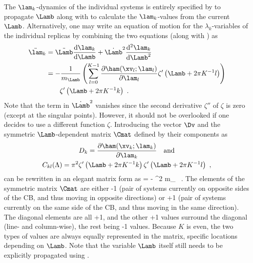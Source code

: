 The $\lam_k$-dynamics of the individual systems is entirely
specified by  to propagate $\Lamb$
along with   to calculate the $\lam_k$-values from the current $\Lamb$.
Alternatively, one may write an equation of motion for the $\lambda_k$-variables of the 
individual replicas by combining the two equations (along with ) as
%
\begin{align}
  \label{eq:cb_lam_eq_mot}
  \ddot{\lam}_k &= \ddot{\Lamb} \frac{\mathrm{d} \lam_k}{\mathrm{d} \Lamb} + \dot{\Lamb}^2 \frac{\mathrm{d^2} \lam_k}{\mathrm{d} \Lamb^2} \nonumber\\
                &= -\frac {1} {m_{\Lamb}} \left( 
                       \sum_{l=0}^{K-1} \frac {\partial\ham(\xv_{l};\lam_{l})} {\partial \lam_{l}} \zeta'\left( \Lamb + 2\pi K^{-1} l \right) 
                       \right) \nonumber  \\
                   & \qquad \zeta'\left( \Lamb + 2\pi K^{-1} k \right) \ .
\end{align}
%
%
Note that the term in $\dot{\Lamb}^2$ vanishes since the second derivative $\zeta''$ of $\zeta$
is zero (except at the  singular points). However, it should not be overlooked 
if one decides to use a different function $\zeta$.
%
Introducing the vector $\Dv$ and the symmetric $\Lamb$-dependent matrix $\Cmat$ defined 
by their components as
%
\begin{multline}
  \label{eq:cb_def}
 D_k = \frac{\partial\ham(\xv_{k};\lam_{k})}{\partial \lam_{k}}
\ \ \ \mathrm{and}\\
C_{kl}(\Lambda) = \pi^2 \zeta'\left( \Lamb + 2\pi K^{-1} k \right) \zeta'\left( \Lamb + 2\pi K^{-1} l \right) \ ,
\end{multline}
%
 can be rewritten in an elegant matrix form as
%
  \ddot{\lamv} = -\frac {\Cmat(\Lamb)} {\pi^2 m_{\Lamb}}  \Dv \ .
\eeq
%
The elements of the symmetric matrix $\Cmat$
are either -1 (pair of systems currently on opposite sides of the CB,
and thus moving in opposite directions) or +1
(pair of systems currently on the same side of the CB, and thus moving in the same direction). The diagonal elements
are all +1, and the other +1 values surround the diagonal (line- and column-wise),
the rest being -1 values.
Because $K$ is even, the two types of values 
are always equally represented in the matrix, 
specific locations
depending on $\Lamb$.
%
Note that the variable $\Lamb$ itself still needs to be explicitly propagated
using .

